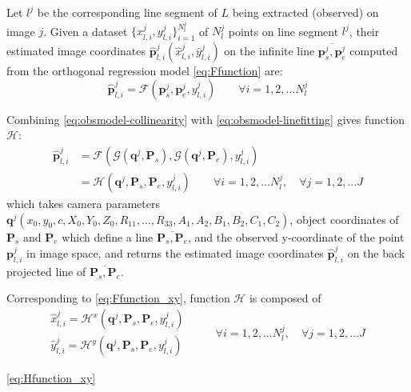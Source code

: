 Let $l^j$ be the corresponding line segment of $L$ being extracted (observed) on image $j$. Given a dataset $\{x^j_{l,i},y^j_{l,i}\}^{N^j_l}_{i=1}$ of $N^j_l$ points on line segment $l^j$, their estimated image coordinates $\hat{\mathbf{p}}^j_{l,i}(\hat{x}^j_{l,i},\hat{y}^j_{l,i})$ on the infinite line $\overline{\mathbf{p}^j_s,\mathbf{p}^j_e}$ computed from the orthogonal regression model \eqref{eq:Ffunction} are:
\begin{equation} \label{eq:obsmodel-linefitting}
\hat{\mathbf{p}}^j_{l,i} = \mathcal{F}(\mathbf{p}^j_s,\mathbf{p}^j_e,y^j_{l,i})
\qquad
\forall i=1,2,...N^j_l
\end{equation}


Combining \eqref{eq:obsmodel-collinearity} with \eqref{eq:obsmodel-linefitting} gives function $\mathcal{H}$:
\begin{equation} \label{eq:Hfunction}
\begin{split}
\hat{\mathbf{p}}^j_{l,i} &= \mathcal{F}(\mathcal{G}(\mathbf{q}^j,\mathbf{P}_s),\mathcal{G}(\mathbf{q}^j,\mathbf{P}_e),y^j_{l,i})\\
&=\mathcal{H}(\mathbf{q}^j,\mathbf{P}_s,\mathbf{P}_e,y^j_{l,i})
\qquad
\forall i=1,2,...N^j_l,\quad\forall j=1,2,...J
\end{split}
\end{equation}
which takes camera parameters $\mathbf{q}^j(x_0,y_0,c,X_0,Y_0,Z_0,R_{11},...,R_{33},A_1,A_2,B_1,B_2,C_1,C_2)$, object coordinates of $\mathbf{P}_s$ and $\mathbf{P}_e$ which define a line $\overline{\mathbf{P}_s,\mathbf{P}_e}$, and the observed y-coordinate of the point $\mathbf{p}^j_{l,i}$ in image space, and returns the estimated image coordinates $\hat{\mathbf{p}}^j_{l,i}$ on the back projected line of $\overline{\mathbf{P}_s,\mathbf{P}_e}$.

Corresponding to \cref{eq:Ffunction_xy}, function $\mathcal{H}$ is composed of
\begin{equation} \label{eq:Hfunction_xy}
\begin{split}
\hat{x}^j_{l,i} = \mathcal{H}^x(\mathbf{q}^j,\mathbf{P}_s,\mathbf{P}_e,y^j_{l,i})\\
\hat{y}^j_{l,i} = \mathcal{H}^y(\mathbf{q}^j,\mathbf{P}_s,\mathbf{P}_e,y^j_{l,i})
\end{split}
\qquad
\begin{split}
\forall i=1,2,...N^j_l,\quad\forall j=1,2,...J
\end{split}
\end{equation}

\cref{eq:Hfunction_xy} 

